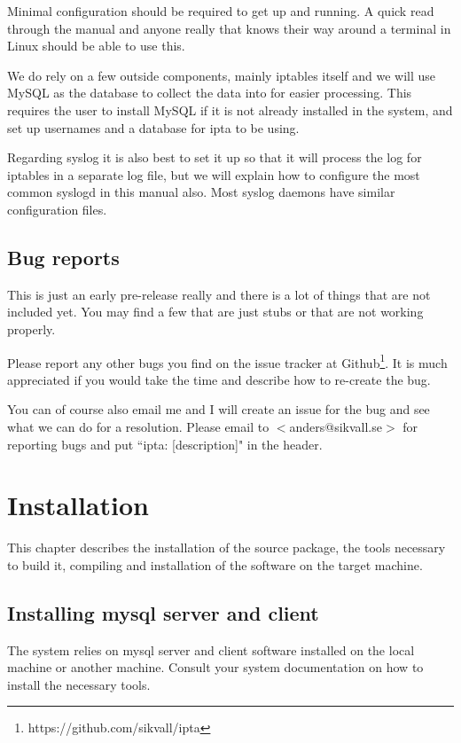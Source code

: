 \documentclass[english,twoside,openright,a4paper,12pt]{article}
\begin{document}
Minimal configuration should be required to get up and running. A
quick read through the manual and anyone really that knows their way
around a terminal in Linux should be able to use this.

We do rely on a few outside components, mainly iptables itself and we
will use MySQL as the database to collect the data into for easier
processing. This requires the user to install MySQL if it is not
already installed in the system, and set up usernames and a database
for ipta to be using.

Regarding syslog it is also best to set it up so that it will process
the log for iptables in a separate log file, but we will explain how
to configure the most common syslogd in this manual also. Most syslog
daemons have similar configuration files.

\subsection{Bug reports}

This is just an early pre-release really and there is a lot of things
that are not included yet. You may find a few that are just stubs or
that are not working properly.

Please report any other bugs you find on the issue tracker at
Github\footnote{https://github.com/sikvall/ipta}. It is much 
appreciated if you
would take the time and describe how to re-create the bug.

You can of course also email me and I will create an issue for the 
bug and
see what we can do for a resolution. Please email to 
$<$anders@sikvall.se$>$
for reporting bugs and put ``ipta: [description]" in the header.
 

\section{Installation}

This chapter describes the installation of the source package, the
tools necessary to build it, compiling and installation of the
software on the target machine.

\subsection{Installing mysql server and client}

The system relies on mysql server and client software installed on the
local machine or another machine. Consult your system documentation on
how to install the necessary tools.
\end{document}
